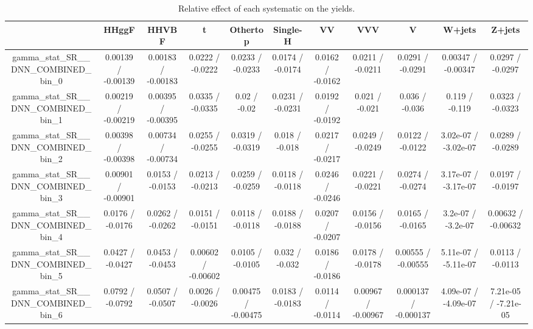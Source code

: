 \documentclass[10pt]{article}
\begin{document}
\begin{table}[htbp]
\begin{center}
\begin{tabular}{|c|c|c|c|c|c|c|c|c|c|c|}
\hline 
      & HHggF      & HHVBF      & t      & Othertop      & Single-H      & VV      & VVV      & V      & W+jets      & Z+jets \\ 
\hline 
  gamma_stat_SR__DNN_COMBINED_bin_0 & 0.00139 / -0.00139 & 0.00183 / -0.00183 & 0.0222 / -0.0222 & 0.0233 / -0.0233 & 0.0174 / -0.0174 & 0.0162 / -0.0162 & 0.0211 / -0.0211 & 0.0291 / -0.0291 & 0.00347 / -0.00347 & 0.0297 / -0.0297 \\ 
  gamma_stat_SR__DNN_COMBINED_bin_1 & 0.00219 / -0.00219 & 0.00395 / -0.00395 & 0.0335 / -0.0335 & 0.02 / -0.02 & 0.0231 / -0.0231 & 0.0192 / -0.0192 & 0.021 / -0.021 & 0.036 / -0.036 & 0.119 / -0.119 & 0.0323 / -0.0323 \\ 
  gamma_stat_SR__DNN_COMBINED_bin_2 & 0.00398 / -0.00398 & 0.00734 / -0.00734 & 0.0255 / -0.0255 & 0.0319 / -0.0319 & 0.018 / -0.018 & 0.0217 / -0.0217 & 0.0249 / -0.0249 & 0.0122 / -0.0122 & 3.02e-07 / -3.02e-07 & 0.0289 / -0.0289 \\ 
  gamma_stat_SR__DNN_COMBINED_bin_3 & 0.00901 / -0.00901 & 0.0153 / -0.0153 & 0.0213 / -0.0213 & 0.0259 / -0.0259 & 0.0118 / -0.0118 & 0.0246 / -0.0246 & 0.0221 / -0.0221 & 0.0274 / -0.0274 & 3.17e-07 / -3.17e-07 & 0.0197 / -0.0197 \\ 
  gamma_stat_SR__DNN_COMBINED_bin_4 & 0.0176 / -0.0176 & 0.0262 / -0.0262 & 0.0151 / -0.0151 & 0.0118 / -0.0118 & 0.0188 / -0.0188 & 0.0207 / -0.0207 & 0.0156 / -0.0156 & 0.0165 / -0.0165 & 3.2e-07 / -3.2e-07 & 0.00632 / -0.00632 \\ 
  gamma_stat_SR__DNN_COMBINED_bin_5 & 0.0427 / -0.0427 & 0.0453 / -0.0453 & 0.00602 / -0.00602 & 0.0105 / -0.0105 & 0.032 / -0.032 & 0.0186 / -0.0186 & 0.0178 / -0.0178 & 0.00555 / -0.00555 & 5.11e-07 / -5.11e-07 & 0.0113 / -0.0113 \\ 
  gamma_stat_SR__DNN_COMBINED_bin_6 & 0.0792 / -0.0792 & 0.0507 / -0.0507 & 0.0026 / -0.0026 & 0.00475 / -0.00475 & 0.0183 / -0.0183 & 0.0114 / -0.0114 & 0.00967 / -0.00967 & 0.000137 / -0.000137 & 4.09e-07 / -4.09e-07 & 7.21e-05 / -7.21e-05 \\ 
\hline 
\end{tabular} 
\caption{Relative effect of each systematic on the yields.} 
\end{center} 
\end{table} 
\end{document}
